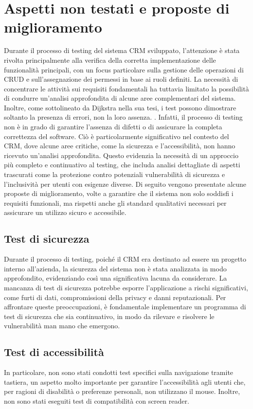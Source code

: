 \documentclass[target=bach,aauheader=,style=]{thud}
\begin{document}
\section{Aspetti non testati e proposte di miglioramento}
Durante il processo di testing del sistema CRM sviluppato, l'attenzione è stata rivolta principalmente alla verifica della corretta implementazione delle funzionalità principali, con un focus particolare sulla gestione delle operazioni di CRUD e sull'assegnazione dei permessi in base ai ruoli definiti. La necessità di concentrare le attività sui requisiti fondamentali ha tuttavia limitato la possibilità di condurre un'analisi approfondita di alcune aree complementari del sistema. Inoltre, come sottolineato da Dijkstra nella sua tesi, i test possono dimostrare soltanto la presenza di errori, non la loro assenza. \cite{dijkstra1972humble}. Infatti, il processo di testing non è in grado di garantire l'assenza di difetti o di assicurare la completa correttezza del software. Ciò è particolarmente significativo nel contesto del CRM, dove alcune aree critiche, come la sicurezza e l'accessibilità, non hanno ricevuto un'analisi approfondita. Questo evidenzia la necessità di un approccio più completo e continuativo al testing, che includa analisi dettagliate di aspetti trascurati come la protezione contro potenziali vulnerabilità di sicurezza e l'inclusività per utenti con esigenze diverse. Di seguito vengono presentate alcune proposte di miglioramento, volte a garantire che il sistema non solo soddisfi i requisiti funzionali, ma rispetti anche gli standard qualitativi necessari per assicurare un utilizzo sicuro e accessibile.

\subsection{Test di sicurezza}
Durante il processo di testing, poiché il CRM era destinato ad essere un progetto interno all'azienda, la sicurezza del sistema non è stata analizzata in modo approfondito, evidenziando così una significativa lacuna da considerare. La mancanza di test di sicurezza potrebbe esporre l'applicazione a rischi significativi, come furti di dati, compromissioni della privacy e danni reputazionali. Per affrontare queste preoccupazioni, è fondamentale implementare un programma di test di sicurezza che sia continuativo, in modo da rilevare e risolvere le vulnerabilità man mano che emergono. 

\subsection{Test di accessibilità}
In particolare, non sono stati condotti test specifici sulla navigazione tramite tastiera, un aspetto molto importante per garantire l'accessibilità agli utenti che, per ragioni di disabilità o preferenze personali, non utilizzano il mouse. Inoltre, non sono stati eseguiti test di compatibilità con screen reader. 
\end{document}
